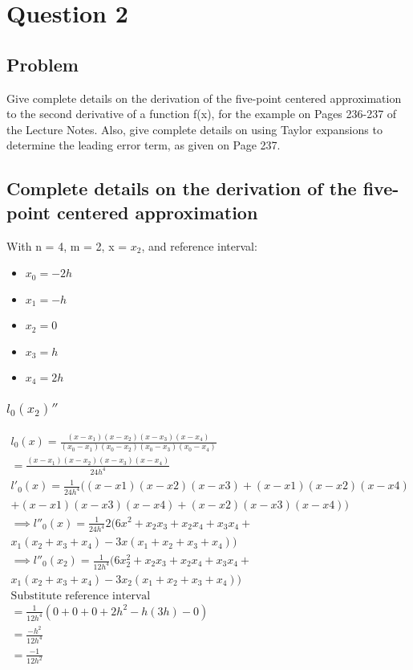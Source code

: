 \section{Question 2}
\subsection{Problem}
Give complete details on the derivation of the five-point centered approximation to the
second derivative of a function f(x), for the example on Pages 236-237 of the Lecture Notes.
Also, give complete details on using Taylor expansions to determine the leading error term,
as given on Page 237.

\subsection{Complete details on the derivation of the five-point centered approximation}
With n = 4, m = 2, x = $x_{2}$, and reference interval: \\
\begin{itemize}
    \item $x_0 = -2 h$
    \item $x_1 = -h$
    \item  $x_2 = 0$
    \item $x_3 = h$
    \item $x_4 = 2h$
\end{itemize}


\subsubsection{$l_{0}(x_{2})''$}
\begin{align*}
    l_{0}(x) = \frac{(x - x_1)(x - x_2)(x - x_3)(x - x_4)}{(x_0 - x_1)(x_0-x_2)(x_0-x_3)(x_0-x_4)} \\
    = \frac{(x - x_1)(x - x_2)(x - x_3)(x - x_4)}{24h^{4}} \\
    l'_{0}(x) = \frac{1}{24h^4} ((x - x1) (x - x2) (x - x3) + (x - x1) (x - x2) (x - x4)\\ + (x - x1) (x - x3) (x - x4) + (x - x2) (x - x3) (x - x4)) \\
\implies l''_{0}(x) = \frac{1}{24h^4} 2 (6 x^2 + x_2 x_3 + x_2 x_4 + x_3 x_4 + \\ x_1 (x_2 + x_3 + x_4) - 3 x (x_1 + x_2 + x_3 + x_4)) \\
\implies l''_{0}(x_2) = \frac{1}{12h^4} (6 x_{2}^2 + x_2 x_3 + x_2 x_4 + x_3 x_4 + \\ x_1 (x_2 + x_3 + x_4) - 3 x_2 (x_1 + x_2 + x_3 + x_4)) \\
\text{Substitute reference interval} \\
= \frac{1}{12h^4}(0 + 0 + 0 + 2h^2 - h(3h) - 0  )\\
= \frac{-h^2}{12h^4} \\
= \frac{-1}{12h^2}
\end{align*}


